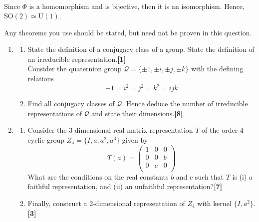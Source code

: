 \documentclass[a4paper]{article}
\begin{document}
\begin{ans}
\begin{enumerate}[label=(\roman*)]
\begin{align}
\end{align}
Since $\Phi$ is a homomorphism and is bijective, then it is an isomorphism. Hence, $\text{SO}(2)\simeq\text{U}(1)$.
\end{enumerate}
\end{ans}
\newpage
\begin{qns}
Any theorems you use should be stated, but need not be proven in this question.
\begin{enumerate}[label=(\roman*)]
\item 
\begin{enumerate}[label=(\alph*)]
\item State the definition of a conjugacy class of a group. State the definition of an
irreducible representation.\hfill\textbf{[1]}\\[5pt]
Consider the quaternion group $\mathcal{Q} = \{\pm 1,\pm i,\pm j,\pm k\}$ with the defining relations
$$−1 = i^2 = j^2 = k^2 = ijk$$
\item Find all conjugacy classes of $\mathcal{Q}$. Hence deduce the number of irreducible representations of $\mathcal{Q}$ and state their dimensions.\hfill\textbf{[8]}
\end{enumerate}
\item 
\begin{enumerate}[label=(\alph*)]
\item Consider the 3-dimensional real matrix representation $T$ of the order 4 cyclic
group $Z_4 = \{I, a, a^2, a^3\}$ given by
$$T(a)=\begin{pmatrix}1&0&0\\0&0&b\\0&c&0\\\end{pmatrix}$$
What are the conditions on the real constants $b$ and $c$ such that $T$ is (i) a faithful representation, and (ii) an unfaithful representation?\hfill\textbf{[7]}
\item
Finally, construct a 2-dimensional representation of $Z_4$ with kernel $\{I, a^2\}$.\hfill\textbf{[3]}
\end{enumerate}
\end{enumerate}
\end{qns}
\end{document}
